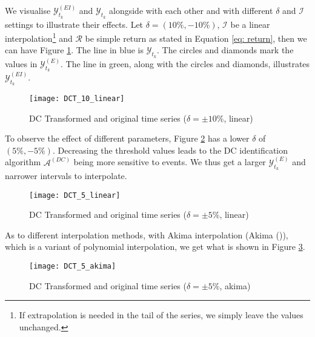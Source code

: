 We visualise $\mathcal{Y}^{(EI)}_{t_k}$ and $\mathcal{Y}_{t_k}$ alongside with each other and with different $\delta$ and $\mathcal{I}$ settings to illustrate their effects. Let $\delta = (10\%, -10\%)$, $\mathcal{I}$ be a linear interpolation\footnote{If extrapolation is needed in the tail of the series, we simply leave the values unchanged.} and $\mathcal{R}$ be simple return as stated in Equation \ref{eq: return}, then we can have Figure \ref{fig: dct 10 linear}. The line in blue is $\mathcal{Y}_{t_k}$. The circles and diamonds mark the values in $\mathcal{Y}^{(E)}_{t_k}$. The line in green, along with the circles and diamonds, illustrates $\mathcal{Y}^{(EI)}_{t_k}$.
\begin{figure}[H]
    \centering
    \texttt{[image: DCT\_10\_linear]}
    \caption{DC Transformed and original time series ($\delta = \pm 10\%$, linear)}
    {\raggedright \footnotesize \par}
    \label{fig: dct 10 linear}
\end{figure}
To observe the effect of different parameters, Figure \ref{fig: dct 5 linear} has a lower $\delta$ of $(5\%, -5\%)$. Decreasing the threshold values leads to the DC identification algorithm $\mathcal{A}^{(DC)}$ being more sensitive to events. We thus get a larger $\mathcal{Y}^{(E)}_{t_k}$ and narrower intervals to interpolate.
\begin{figure}[H]
    \centering
    \texttt{[image: DCT\_5\_linear]}
    \caption{DC Transformed and original time series ($\delta = \pm 5\%$, linear)}
    {\raggedright \footnotesize \par}
    \label{fig: dct 5 linear}
\end{figure}
As to different interpolation methods, with Akima interpolation (Akima (\citeyear{akima1970new})), which is a variant of polynomial interpolation, we get what is shown in Figure \ref{fig: dct 5 akima}.
\begin{figure}[H]
    \centering
    \texttt{[image: DCT\_5\_akima]}
    \caption{DC Transformed and original time series ($\delta = \pm 5\%$, akima)}
    {\raggedright \footnotesize \par}
    \label{fig: dct 5 akima}
\end{figure}

